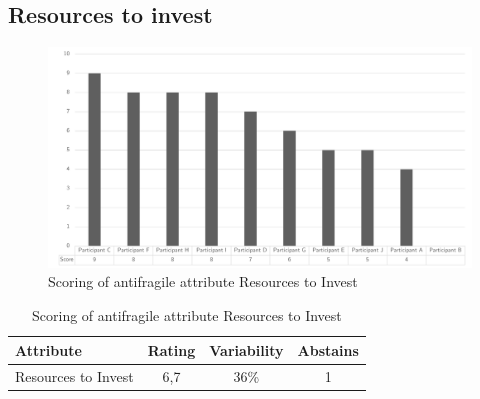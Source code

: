 \subsection{Resources to invest}
\begin{figure}[H]
	\centering
	\includegraphics[width=0.9\linewidth]{images/scoreafresourcestoinvest}
	\caption[Scoring of antifragile attribute Resources to Invest]{Scoring of antifragile attribute Resources to Invest}
	\label{fig:appscoringafresourcestoinvest}
\end{figure}
\begin{table}[H]
	\centering
	\begin{tabular}{p{}ccc}
		\toprule
		\textbf{Attribute} & \textbf{Rating} & \textbf{Variability} & \textbf{Abstains} \\
		\midrule
		Resources to Invest & 6,7 & 36\% & 1 \\%
		\bottomrule
	\end{tabular}%
	\caption[Scoring of antifragile attribute Resources to Invest]{Scoring of antifragile attribute Resources to Invest}
	\label{tab:appscoringafresourcestoinvest}%
\end{table}%
\newpage
